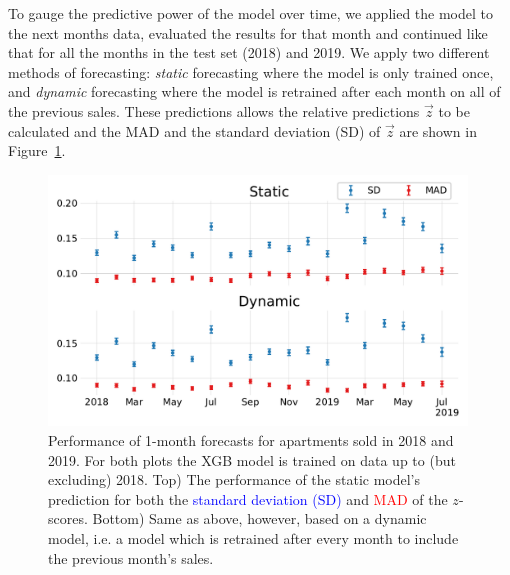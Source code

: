 To gauge the predictive power of the model over time, we applied the model to the next months data, evaluated the results for that month and continued like that for all the months in the test set (\num{2018}) and \num{2019}. We apply two different methods of forecasting: \emph{static} forecasting where the model is only trained once, and \emph{dynamic} forecasting where the model is retrained after each month on all of the previous sales. These predictions allows the relative predictions $\vec{z}$ to be calculated and the MAD and the standard deviation (SD) of $\vec{z}$ are shown in Figure~\ref{fig:h:forecast_MAD_SD}. 
\begin{figure}
  \centerfloat
  \includegraphics[width=0.99\textwidth, trim=10 15 10 10, clip]{figures/housing/Ejerlejlighed_v19_cut_all_Ncols_all_xgb_forecast_prediction_MAD.pdf}
  \caption[Standard Deviation and MAD of the Static and Dynamic XGB Forecasts]
          {Performance of 1-month forecasts for apartments sold in \num{2018} and \num{2019}. For both plots the XGB model is trained on data up to (but excluding) 2018. Top) The performance of the static model's prediction for both the \textcolor{blue}{standard deviation (SD)} and \textcolor{red}{MAD} of the $z$-scores. Bottom) Same as above, however, based on a dynamic model, i.e. a model which is retrained after every month to include the previous month's sales.} 
  \label{fig:h:forecast_MAD_SD}
\end{figure}

